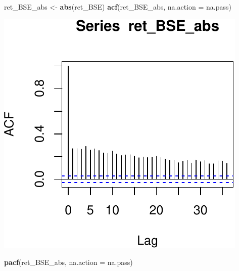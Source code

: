 \documentclass[11pt,]{article}
\newenvironment{Shaded}{\begin{snugshade}}{\end{snugshade}}
\newcommand{\KeywordTok}[1]{\textcolor[rgb]{0.13,0.29,0.53}{\textbf{#1}}}
\newcommand{\DataTypeTok}[1]{\textcolor[rgb]{0.13,0.29,0.53}{#1}}
\newcommand{\StringTok}[1]{\textcolor[rgb]{0.31,0.60,0.02}{#1}}
\newcommand{\NormalTok}[1]{#1}
\begin{document}
\begin{Shaded}
\begin{Highlighting}[]
\NormalTok{ret_BSE_abs <-}\StringTok{ }\KeywordTok{abs}\NormalTok{(ret_BSE)}
\KeywordTok{acf}\NormalTok{(ret_BSE_abs, }\DataTypeTok{na.action =}\NormalTok{ na.pass)}
\end{Highlighting}
\end{Shaded}

\begin{center}\includegraphics{FMC_T4_PhD_ARMA_GARCH_files/figure-latex/BSE_ret_ACF_sq-3} \end{center}

\begin{Shaded}
\begin{Highlighting}[]
\KeywordTok{pacf}\NormalTok{(ret_BSE_abs, }\DataTypeTok{na.action =}\NormalTok{ na.pass)}
\end{Highlighting}
\end{Shaded}
\end{document}
